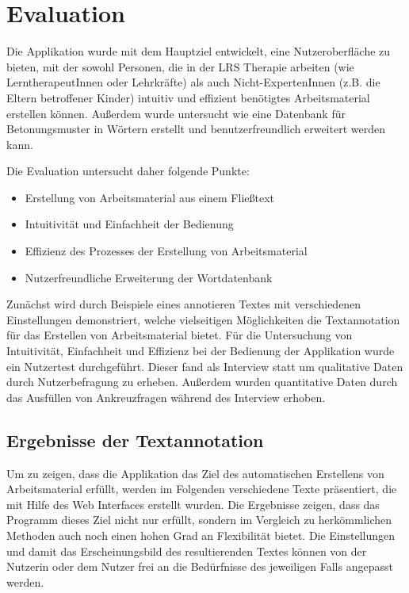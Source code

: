 
\chapter{Evaluation}

Die Applikation wurde mit dem Hauptziel entwickelt, eine Nutzeroberfläche zu bieten, mit der sowohl Personen, die in der LRS Therapie arbeiten (wie LerntherapeutInnen oder Lehrkräfte) als auch Nicht-ExpertenInnen (z.B. die Eltern betroffener Kinder) intuitiv und effizient benötigtes Arbeitsmaterial erstellen können. Außerdem wurde untersucht wie eine Datenbank für Betonungsmuster in Wörtern erstellt und benutzerfreundlich erweitert werden kann.

Die Evaluation untersucht daher folgende Punkte:
\begin{itemize}
	\item Erstellung von Arbeitsmaterial aus einem Fließtext
	\item Intuitivität und Einfachheit der Bedienung
	\item Effizienz des Prozesses der Erstellung von Arbeitsmaterial
	\item Nutzerfreundliche Erweiterung der Wortdatenbank
\end{itemize}

Zunächst wird durch Beispiele eines annotieren Textes mit verschiedenen Einstellungen demonstriert, welche vielseitigen Möglichkeiten die Textannotation für das Erstellen von Arbeitsmaterial bietet. Für die Untersuchung von Intuitivität, Einfachheit und Effizienz bei der Bedienung der Applikation wurde ein Nutzertest durchgeführt. Dieser fand als Interview statt um qualitative Daten durch Nutzerbefragung zu erheben. Außerdem wurden quantitative Daten durch das Ausfüllen von Ankreuzfragen während des Interview erhoben.

\section{Ergebnisse der Textannotation}
\label{sec:annotation-results}

Um zu zeigen, dass die Applikation das Ziel des automatischen Erstellens von Arbeitsmaterial erfüllt, werden im Folgenden verschiedene Texte präsentiert, die mit Hilfe des Web Interfaces erstellt wurden. Die Ergebnisse zeigen, dass das Programm dieses Ziel nicht nur erfüllt, sondern im Vergleich zu herkömmlichen Methoden auch noch einen hohen Grad an Flexibilität bietet. Die Einstellungen und damit das Erscheinungsbild des resultierenden Textes können von der Nutzerin oder dem Nutzer frei an die Bedürfnisse des jeweiligen Falls angepasst werden.

